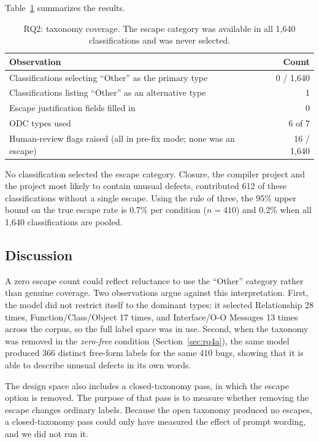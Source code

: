 \documentclass{iutbscthesis}
\begin{document}
Table~\ref{tab:rq2} summarizes the results.

\begin{table}[!htbp]
    \centering
    \begin{tabular}{p{10.0cm} r}
        \toprule
        \textbf{Observation} & \textbf{Count} \\
        \midrule
        Classifications selecting ``Other'' as the primary type & 0 / 1{,}640 \\
        Classifications listing ``Other'' as an alternative type & 1 \\
        Escape justification fields filled in & 0 \\
        ODC types used & 6 of 7 \\
        Human-review flags raised (all in pre-fix mode; none was an escape) & 16 / 1{,}640 \\
        \bottomrule
    \end{tabular}
    \caption{RQ2: taxonomy coverage. The escape category was available in all 1{,}640 classifications and was never selected.}
    \label{tab:rq2}
\end{table}

No classification selected the escape category. Closure, the compiler project and the project most likely to contain unusual defects, contributed 612 of these classifications without a single escape. Using the rule of three, the 95\% upper bound on the true escape rate is 0.7\% per condition ($n = 410$) and 0.2\% when all 1{,}640 classifications are pooled.

\subsection{Discussion}

A zero escape count could reflect reluctance to use the ``Other'' category rather than genuine coverage. Two observations argue against this interpretation. First, the model did not restrict itself to the dominant types: it selected Relationship 28 times, Function/\allowbreak Class/\allowbreak Object 17 times, and Interface/\allowbreak O-O Messages 13 times across the corpus, so the full label space was in use. Second, when the taxonomy was removed in the \textit{zero-free} condition (Section~\ref{sec:rq4a}), the same model produced 366 distinct free-form labels for the same 410 bugs, showing that it is able to describe unusual defects in its own words.

The design space also includes a closed-taxonomy pass, in which the escape option is removed. The purpose of that pass is to measure whether removing the escape changes ordinary labels. Because the open taxonomy produced no escapes, a closed-taxonomy pass could only have measured the effect of prompt wording, and we did not run it.
\end{document}
